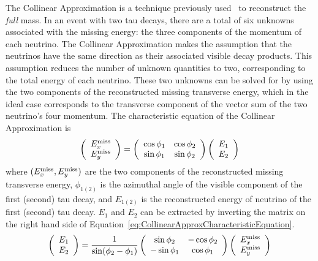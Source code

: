 The Collinear Approximation is a technique previously
used~\cite{Rainwater:1998kj} to reconstruct the \emph{full} \TT mass.  In an
event with two tau decays, there are a total of six unknowns associated with the
missing energy: the three components of the momentum of each neutrino.  The
Collinear Approximation makes the assumption that the neutrinos have the same
direction as their associated visible decay products.  This assumption reduces
the number of unknown quantities to two, corresponding to the total energy of
each neutrino.  These two unknowns can be solved for by using the two components
of the reconstructed missing transverse energy, which in the ideal case
corresponds to the transverse component of the vector sum of the two neutrino's
four momentum.  The characteristic equation of the Collinear Approximation is 
\begin{equation}
  \left( \begin{array}{c} E_{x}^{\text{miss}} \\ E_{y}^{\text{miss}} \end{array} \right) = 
    \left( \begin{array}{cc} 
      \cos\phi_1 & \cos\phi_2 \\
      \sin\phi_1 & \sin\phi_2 
    \end{array} \right) 
    \left(\begin{array}{c} E_1 \\ E_2 \end{array} \right)
      \label{eq:CollinearApproxCharacteristicEquation}
\end{equation}
where $(E_{x}^{\text{miss}}, E_{y}^{\text{miss}})$ are the two components of the reconstructed missing
transverse energy, $\phi_{1(2)}$ is the azimuthal angle of the visible component
of the first (second) tau decay, and $E_{1(2)}$ is the reconstructed energy of
neutrino of the first (second) tau decay.  $E_1$ and $E_2$ can be extracted by
inverting the matrix on the right hand side of
Equation~\ref{eq:CollinearApproxCharacteristicEquation}.
\begin{equation}
  \left(\begin{array}{c} E_1 \\ E_2 \end{array} \right) = 
    \frac{1}{\sin(\phi_2 - \phi_1)} 
    \left( \begin{array}{cc} 
      \sin\phi_2 & -\cos\phi_2 \\
      -\sin\phi_1 & \cos\phi_1 
    \end{array} \right) 
  \left( \begin{array}{c} E_{x}^{\text{miss}} \\ E_{y}^{\text{miss}} \end{array} \right) 
    \label{eq:CollinearApproxInvertedEquation} 
\end{equation}

